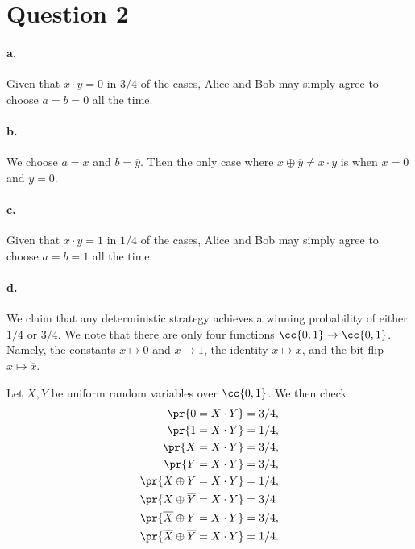 \documentclass{article}
\begin{document}
\section*{Question 2}

\paragraph{a.} Given that $x\cdot y=0$ in $3/4$ of the cases, Alice and Bob may simply
agree to choose $a=b=0$ all the time.

\paragraph{b.} We choose $a = x$ and $b = \overline{y}$. Then the only case where $x \oplus\overline{y} \neq x \cdot y$ is when $x=0$ and $y=0$.

\paragraph{c.} Given that $x\cdot y=1$ in $1/4$ of the cases, Alice and Bob may simply
agree to choose $a=b=1$ all the time.

\paragraph{d.} We claim that any deterministic strategy achieves a winning probability
of either $1/4$ or $3/4$. We note that there are only four functions $\cc{0,1}\to\cc{0,1}$.
Namely, the constants $x\mapsto 0$ and $x \mapsto 1$, the identity $x\mapsto x$, and the
bit flip $x\mapsto\overline x$.

Let $X,Y$ be uniform random variables over $\cc{0,1}$. We then check
\begin{align*}
  \pr{0 = X \cdot Y} &= 3/4, \\
  \pr{1 = X \cdot Y} &= 1/4, \\
  \pr{X = X \cdot Y} &= 3/4, \\
  \pr{Y = X \cdot Y} &= 3/4, \\
  \pr{X \oplus Y = X \cdot Y} &= 1/4,\\
  \pr{X \oplus \overline Y = X \cdot Y} &= 3/4 \\
  \pr{\overline X \oplus Y = X \cdot Y} &= 3/4,\\
  \pr{\overline X \oplus \overline Y = X \cdot Y} &= 1/4.
\end{align*}
\end{document}
